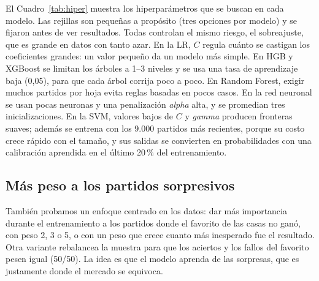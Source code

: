 \documentclass[conference]{IEEEtran}
\begin{document}
El Cuadro~\ref{tab:hiper} muestra los hiperparámetros que se buscan en cada modelo. Las rejillas son pequeñas a propósito (tres opciones por modelo) y se fijaron antes de ver resultados. Todas controlan el mismo riesgo, el sobreajuste, que es grande en datos con tanto azar. En la LR, $C$ regula cuánto se castigan los coeficientes grandes: un valor pequeño da un modelo más simple. En HGB y XGBoost se limitan los árboles a 1--3 niveles y se usa una tasa de aprendizaje baja (0,05), para que cada árbol corrija poco a poco. En Random Forest, exigir muchos partidos por hoja evita reglas basadas en pocos casos. En la red neuronal se usan pocas neuronas y una penalización \emph{alpha} alta, y se promedian tres inicializaciones. En la SVM, valores bajos de $C$ y \emph{gamma} producen fronteras suaves; además se entrena con los 9.000 partidos más recientes, porque su costo crece rápido con el tamaño, y sus salidas se convierten en probabilidades con una calibración aprendida en el último 20\,\% del entrenamiento.
\begin{table}[!htb]
\caption{Rejillas de hiperparámetros, ordenadas en cada fila de la configuración más regularizada a la menos regularizada. HGB y XGBoost usan tasa de aprendizaje 0,05; Random Forest, 150 árboles.}
\centering\footnotesize
{}
\label{tab:hiper}
\end{table}


\subsection{Más peso a los partidos sorpresivos}
También probamos un enfoque centrado en los datos: dar más importancia durante el entrenamiento a los partidos donde el favorito de las casas no ganó, con peso 2, 3 o 5, o con un peso que crece cuanto más inesperado fue el resultado. Otra variante rebalancea la muestra para que los aciertos y los fallos del favorito pesen igual (50/50). La idea es que el modelo aprenda de las sorpresas, que es justamente donde el mercado se equivoca.
\end{document}
